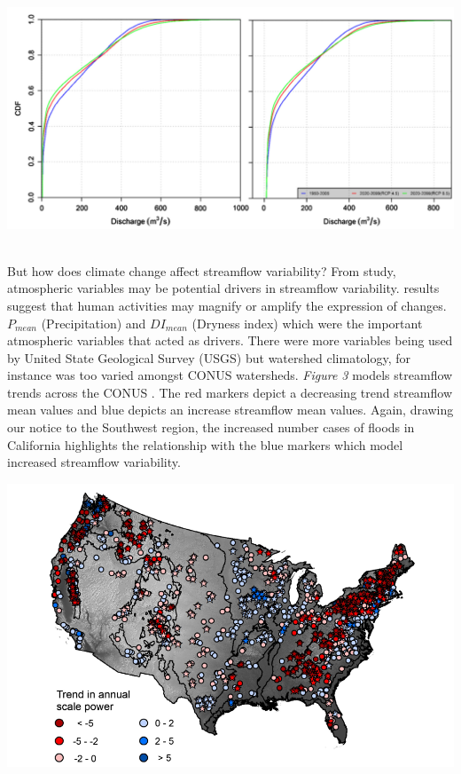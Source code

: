 \documentclass[a4paper,man,biblatex]{apa7}
\begin{document}
\begin{minipage}{0.65\linewidth}   
    \centering
    \includegraphics[scale=0.40]{cdf_streamflow.png}
\end{minipage}
\vspace{2ex}
\\But how does climate change affect streamflow variability? From \textcite{rice_2016} study, atmospheric variables may be potential drivers in streamflow variability. \textcite{rice_2016} results suggest that human activities may magnify or amplify the expression of changes. $P_\textit{mean}$ (Precipitation) and $DI_\textit{mean}$ (Dryness index) which were the important atmospheric variables that acted as drivers. There were more variables being used by United State Geological Survey (USGS) but watershed climatology, for instance was too varied amongst CONUS watersheds. \textit{Figure 3} models streamflow trends across the CONUS \autocite{rice_2016}. The red markers depict a decreasing trend streamflow mean values and blue depicts an increase streamflow mean values. Again, drawing our notice to the Southwest region, the increased number cases of floods in California highlights the relationship with the blue markers which model increased streamflow variability. 
\medskip

 \begin{minipage}{0.65\linewidth}   
     \centering
    \includegraphics[scale=.4]{conus_trend}
\end{minipage}
\end{document}
